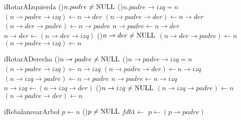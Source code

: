 \begin{Algoritmos}
  \begin{algoritmo}{iRotarAIzquierda}{}{}
    \If(){$n.padre \neq \textrm{NULL}$}{
      \eIf(){$n.padre \to izq = n$}{
        $(n \to padre \to izq) \gets n \to der$ 
      }{
        $(n \to padre \to der) \gets n \to der$ 
      }
    }
    $(n \to der \to padre) \gets n \to padre$  
    $n \to padre \gets n \to der$ 
    $n \to der \gets (n \to der \to izq)$ 
    \If(){$n \to der \neq \textrm{NULL}$}{
      $(n \to der \to padre) \gets n$ 
    }
    $(n \to padre \to izq) \gets n$ 
     
     
  \end{algoritmo}

  \begin{algoritmo}{iRotarADerecha}{}{}
    \If(){$n \to padre \neq \textrm{NULL}$}{
      \eIf(){$n \to padre \to izq = n$}{
        $(n \to padre \to izq) \gets n \to izq$ 
      }{
        $(n \to padre \to der) \gets n \to izq$ 
      }
    }
    $(n \to izq \to padre) \gets n \to padre$  
    $n \to padre \gets n \to izq$ 
    $n \to izq \gets (n \to izq \to der)$ 
    \If(){$n \to izq \neq \textrm{NULL}$}{
      $(n \to izq \to padre) \gets n$ 
    }
    $(n \to padre \to der) \gets n$ 
     
     
  \end{algoritmo}

  \begin{algoritmo}{iRebalancearArbol}{}{}
     $p \gets n$ 
    \While(){$p \neq \textrm{NULL}$}{ 
       
       $fdb1 \gets$  
      $p \gets (p \to padre)$ 
    }
  \end{algoritmo}

\end{Algoritmos}